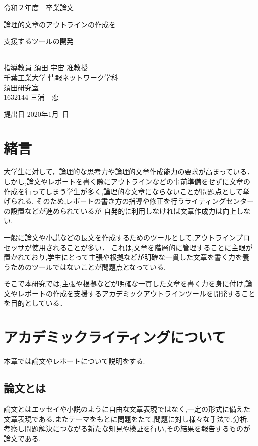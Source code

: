 \documentclass[a4j,12pt]{jarticle}
\begin{document}
\begin{center}
\thispagestyle{empty}
\vspace*{5zh}
\huge
令和２年度　卒業論文\\[50pt]
{\Huge 論理的文章のアウトラインの作成を

支援するツールの開発}\\
[80pt]
\huge
指導教員 須田 宇宙 准教授\\[30pt]
千葉工業大学 情報ネットワーク学科\\[10pt]
須田研究室\\[60pt]
1632144 \hspace{70pt} 三浦　恋\\[75pt]
\end{center}
\vspace*{-2cm}
\begin{flushright} 
\huge
提出日 2020年1月--日
\end{flushright}

\newpage
{}
\tableofcontents
\newpage
{}
\section{緒言}

大学生に対して，論理的な思考力や論理的文章作成能力の要求が高まっている．
しかし,論文やレポートを書く際にアウトラインなどの事前準備をせずに文章の作成を行ってしまう学生が多く,論理的な文章にならないことが問題点として挙げられる.
そのため,レポートの書き方の指導や修正を行うライティングセンターの設置などが進められているが
自発的に利用しなければ文章作成力は向上しない.

一般に論文や小説などの長文を作成するためのツールとして,アウトラインプロセッサが使用されることが多い．
これは,文章を階層的に管理することに主眼が置かれており,学生にとって主張や根拠などが明確な一貫した文章を書く力を養うためのツールではないことが問題点となっている.

そこで本研究では,主張や根拠などが明確な一貫した文章を書く力を身に付け,論文やレポートの作成を支援するアカデミックアウトラインツールを開発することを目的としている．
\newpage
\section{アカデミックライティングについて}
本章では論文やレポートについて説明をする.
\subsection{論文とは}
論文とはエッセイや小説のように自由な文章表現ではなく,一定の形式に備えた文章表現である.またテーマをもとに問題をたて,問題に対し様々な手法で,分析,考察し問題解決につながる新たな知見や検証を行い,その結果を報告するものが論文である\cite{ren1}.
\end{document}
